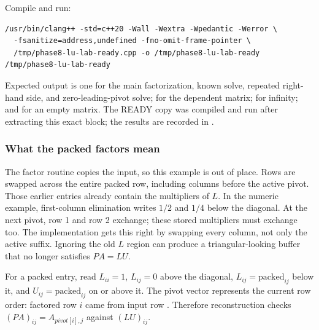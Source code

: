 Compile and run:

\begin{verbatim}
/usr/bin/clang++ -std=c++20 -Wall -Wextra -Wpedantic -Werror \
  -fsanitize=address,undefined -fno-omit-frame-pointer \
  /tmp/phase8-lu-lab-ready.cpp -o /tmp/phase8-lu-lab-ready
/tmp/phase8-lu-lab-ready
\end{verbatim}

Expected output is one  for the main factorization, known solve, repeated right-hand side, and zero-leading-pivot solve;  for the dependent matrix;  for infinity; and  for an empty matrix. The READY copy was compiled and run after extracting this exact block; the results are recorded in .

\subsubsection{What the packed factors mean}\label{01-foundations-i-ch019-what-the-packed-factors-mean}

\hypertarget{01-foundations-i-ch019-what-the-packed-factors-mean}{}

The factor routine copies the input, so this example is out of place. Rows are swapped across the entire packed row, including columns before the active pivot. Those earlier entries already contain the multipliers of \(L\). In the numeric example, first-column elimination writes \(1/2\) and \(1/4\) below the diagonal. At the next pivot, row 1 and row 2 exchange; these stored multipliers must exchange too. The implementation gets this right by swapping every column, not only the active suffix. Ignoring the old \(L\) region can produce a triangular-looking buffer that no longer satisfies \(PA=LU\).

For a packed entry, read \(L_{ii}=1\), \(L_{ij}=0\) above the diagonal, \(L_{ij}=\text{packed}_{ij}\) below it, and \(U_{ij}=\text{packed}_{ij}\) on or above it. The pivot vector represents the current row order: factored row \(i\) came from input row \BookInlineCode{{p}{i}{v}{o}{t}{{[}}{i}{{]}}}{pivot{[}i{]}}. Therefore reconstruction checks \((PA)_{ij}=A_{pivot[i],j}\) against \((LU)_{ij}\).

